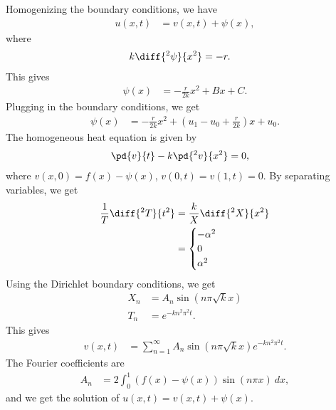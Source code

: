 \documentclass[10pt]{mypackage}
\begin{document}
\begin{solution}[12.6, Problem 4]
  Homogenizing the boundary conditions, we have
  \begin{align*}
    u\left( x,t \right) &= v\left( x,t \right) + \psi(x),
  \end{align*}
  where
  \begin{align*}
    k\diff{^2\psi}{x^2} &= -r.
  \end{align*}
  This gives
  \begin{align*}
    \psi\left( x \right) &= -\frac{r}{2k}x^2 + Bx + C.
  \end{align*}
  Plugging in the boundary conditions, we get
  \begin{align*}
    \psi(x) &= -\frac{r}{2k}x^2 + \left( u_1 - u_0 + \frac{r}{2k} \right)x + u_0.
  \end{align*}
  The homogeneous heat equation is given by
  \begin{align*}
    \pd{v}{t} - k\pd{^2v}{x^2} &= 0,
  \end{align*}
  where $v\left( x,0 \right) = f(x) - \psi(x)$, $v\left( 0,t  \right) = v\left( 1,t \right) = 0$. By separating variables, we get
  \begin{align*}
    \frac{1}{T}\diff{^2T}{t^2} &= \frac{k}{X}\diff{^2X}{x^2}\\
                               &= \begin{cases}
                                 -\alpha^2\\
                                 0\\
                                 \alpha^2
                               \end{cases}
  \end{align*}
  Using the Dirichlet boundary conditions, we get
  \begin{align*}
    X_n &= A_n\sin\left( n\pi\sqrt{k} x \right)\\
    T_n &= e^{-kn^2\pi^2 t}.
  \end{align*}
  This gives
  \begin{align*}
    v\left( x,t \right) &= \sum_{n=1}^{\infty}A_n\sin\left( n\pi\sqrt{k}x \right)e^{-kn^2\pi^2 t}.
  \end{align*}
  The Fourier coefficients are
  \begin{align*}
    A_n &= 2 \int_{0}^{1} \left( f(x)-\psi(x) \right)\sin\left( n\pi x \right)\:dx,
  \end{align*}
  and we get the solution of $u\left( x,t \right) = v\left( x,t \right) + \psi(x)$.
\end{solution}
\end{document}

